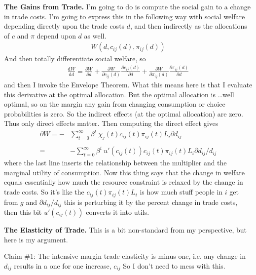 \documentclass[12pt,pdftex]{article}
\begin{document}
\begin{onehalfspacing}
\textbf{The Gains from Trade.} I'm going to do is compute the social gain to a change in trade costs. I'm going to express this in the following way with social welfare depending directly upon the trade costs $d$, and then indirectly as the allocations of $c$ and $\pi$ depend upon $d$ as well.
\begin{align}
W(d, c_{ij}(d), \pi_{ij}(d))
\end{align}
And then totally differentiate social welfare, so
\begin{align}
\frac{\mathrm{d} W}{\mathrm{d}d} = \frac{\partial W}{\partial d} + \frac{\partial W}{\partial c_{ij}(d)}\frac{\partial c_{ij}(d)}{\partial d} + \frac{\partial W}{\partial \pi_{ij}(d)}\frac{\partial \pi_{ij}(d)}{\partial d}
\end{align}
and then I invoke the Envelope Theorem. What this means here is that I evaluate this derivative at the optimal allocation. But the optimal allocation is \ldots well optimal, so on the margin any gain from changing consumption or choice probabilities is zero. So the indirect effects (at the optimal allocation) are zero. Thus only direct effects matter. Then computing the direct effect gives
\begin{align}
\partial W = - & \sum_{t=0}^{\infty} \beta^{t} \ \chi_{j}(t) c_{ij}(t) \pi_{ij}(t) L_{i} \partial d_{ij} \\
\nonumber \\
=& - \sum_{t=0}^{\infty} \beta^{t} \ u'(c_{ij}(t)) c_{ij}(t) \pi_{ij}(t) L_{i} \partial d_{ij} / d_{ij}
\end{align}
where the last line inserts the relationship between the multiplier and the marginal utility of consumption. Now this thing says that the change in welfare equals essentially how much the resource constraint is relaxed by the change in trade costs. So it's like the $c_{ij}(t) \pi_{ij}(t) L_{i}$ is how much stuff people in $i$ get from $g$ and $\partial d_{ij} / d_{ij}$ this is perturbing it by the percent change in trade costs, then this bit $u'(c_{ij}(t))$ converts it into utils.

\textbf{The Elasticity of Trade.} This is a bit non-standard from my perspective, but here is my argument.

Claim \#1: The intensive margin trade elasticity is minus one, i.e. any change in $d_{ij}$ results in a one for one increase, $c_{ij}$ So I don't need to mess with this.


\end{onehalfspacing}
\end{document}
